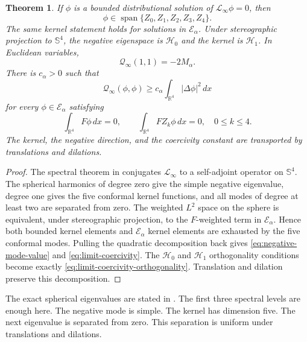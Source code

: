 \documentclass[11pt]{article}
\newtheorem{theorem}{Theorem}[section]
\numberwithin{equation}{section}
\begin{document}
\begin{theorem}\label{thm:limit-input}
If $\phi$ is a bounded distributional solution of
$\mathcal L_\infty\phi=0$, then
\begin{equation*}
\phi\in\operatorname{span}\{Z_0,Z_1,Z_2,Z_3,Z_4\}.
\end{equation*}
The same kernel statement holds for solutions in
$\mathcal E_\alpha$. Under stereographic projection to $\mathbb S^4$,
the negative eigenspace is $\mathcal H_0$ and the kernel is
$\mathcal H_1$. In Euclidean variables,
\begin{equation}\label{eq:negative-mode-value}
\mathcal Q_\infty(1,1)=-2M_\alpha.
\end{equation}
There is $c_\alpha>0$ such that
\begin{equation}\label{eq:limit-coercivity}
\mathcal Q_\infty(\phi,\phi)
\geq c_\alpha\int_{\mathbb R^4}|\Delta\phi|^2\,dx
\end{equation}
for every $\phi\in\mathcal E_\alpha$ satisfying
\begin{equation}\label{eq:limit-coercivity-orthogonality}
\int_{\mathbb R^4}F\phi\,dx=0,
\qquad
\int_{\mathbb R^4}FZ_k\phi\,dx=0,
\quad 0\leq k\leq4.
\end{equation}
The kernel, the negative direction, and the coercivity constant are
transported by translations and dilations.
\end{theorem}

\begin{proof}
The spectral theorem in \cite[Theorem 1.2]{DengSpectrum} conjugates
$\mathcal L_\infty$ to a self-adjoint operator on $\mathbb S^4$. The
spherical harmonics of degree zero give the simple negative
eigenvalue, degree one gives the five conformal kernel functions, and
all modes of degree at least two are separated from zero. The
weighted $L^2$ space on the sphere is equivalent, under
stereographic projection, to the $F$-weighted term in
$\mathcal E_\alpha$. Hence both bounded kernel elements and
$\mathcal E_\alpha$ kernel elements are exhausted by the five
conformal modes. Pulling the quadratic decomposition back gives
\eqref{eq:negative-mode-value} and \eqref{eq:limit-coercivity}. The
$\mathcal H_0$ and $\mathcal H_1$ orthogonality conditions become
exactly \eqref{eq:limit-coercivity-orthogonality}. Translation and
dilation preserve this decomposition.
\end{proof}

The exact spherical eigenvalues are stated in \cite[Theorem 1.2]{DengSpectrum}. The first three spectral levels are enough here. The negative mode is simple. The kernel has dimension five. The next eigenvalue is separated from zero. This separation is uniform under translations and dilations.
\end{document}
